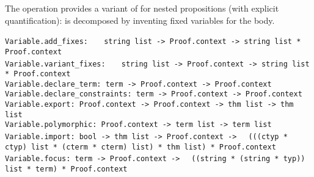\begin{isabellebody}
\begin{isamarkuptext}
  The  operation provides a variant of 
  for nested propositions (with explicit quantification):  is
  decomposed by inventing fixed variables  for the body.%
\end{isamarkuptext}%
\isamarkuptrue%
%
\isadelimmlref
%
\endisadelimmlref
%
\isatagmlref
%
\begin{isamarkuptext}%
\begin{mldecls}
  \verb|Variable.add_fixes: |\isasep\isanewline%
\verb|  string list -> Proof.context -> string list * Proof.context| \\
  \verb|Variable.variant_fixes: |\isasep\isanewline%
\verb|  string list -> Proof.context -> string list * Proof.context| \\
  \verb|Variable.declare_term: term -> Proof.context -> Proof.context| \\
  \verb|Variable.declare_constraints: term -> Proof.context -> Proof.context| \\
  \verb|Variable.export: Proof.context -> Proof.context -> thm list -> thm list| \\
  \verb|Variable.polymorphic: Proof.context -> term list -> term list| \\
  \verb|Variable.import: bool -> thm list -> Proof.context ->|\isasep\isanewline%
\verb|  (((ctyp * ctyp) list * (cterm * cterm) list) * thm list) * Proof.context| \\
  \verb|Variable.focus: term -> Proof.context ->|\isasep\isanewline%
\verb|  ((string * (string * typ)) list * term) * Proof.context| \\
  \end{mldecls}


\end{isamarkuptext}
\end{isabellebody}
